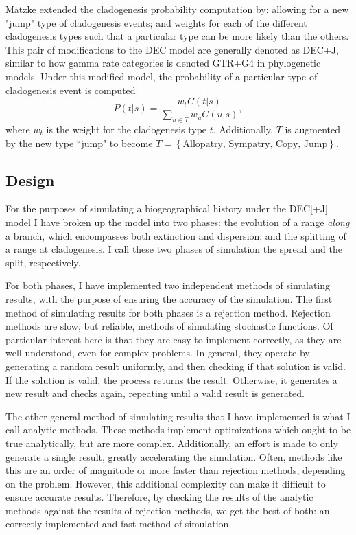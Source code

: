 \documentclass{article}
\begin{document}
Matzke\cite{ModelSelectionMatzke2014} extended the cladogenesis probability
computation by: allowing for a new "jump" type of cladogenesis events; and
weights for each of the different cladogenesis types such that a particular
type can be more likely than the others.
This pair of modifications to the DEC model are generally denoted as DEC+J,
similar to how gamma rate categories is denoted GTR+G4 in phylogenetic models.
Under this modified model, the probability of a particular type of cladogenesis
event is computed
\[
	P(t | s) = \frac{w_t C(t | s)}{\sum_{u \in T} w_u C(u |
		s)},
\]
where $w_t$ is the weight for the cladogenesis type $t$.
Additionally, $T$ is augmented by the new type ``jump" to become \(T =
\left\{\text{Allopatry, Sympatry, Copy, Jump}\right\} \).

\subsection{Design}

For the purposes of simulating a biogeographical history under the DEC[+J]
model I have broken up the model into two phases: the evolution of a range
\textit{along} a branch, which encompasses both extinction and dispersion; and
the splitting of a range at cladogenesis.
I call these two phases of simulation the spread and the split, respectively.

For both phases, I have implemented two independent methods of simulating
results, with the purpose of ensuring the accuracy of the simulation.
The first method of simulating results for both phases is a rejection method.
Rejection methods are slow, but reliable, methods of simulating stochastic
functions.
Of particular interest here is that they are easy to implement correctly, as
they are well understood, even for complex problems.
In general, they operate by generating a random result uniformly, and then
checking if that solution is valid.
If the solution is valid, the process returns the result.
Otherwise, it generates a new result and checks again, repeating until a valid
result is generated.

The other general method of simulating results that I have implemented is what
I call analytic methods.
These methods implement optimizations which ought to be true analytically, but
are more complex.
Additionally, an effort is made to only generate a single result, greatly
accelerating the simulation.
Often, methods like this are an order of magnitude or more faster than
rejection methods, depending on the problem.
However, this additional complexity can make it difficult to ensure accurate
results.
Therefore, by checking the results of the analytic methods against the results
of rejection methods, we get the best of both: an correctly implemented and
fast method of simulation.
\end{document}
